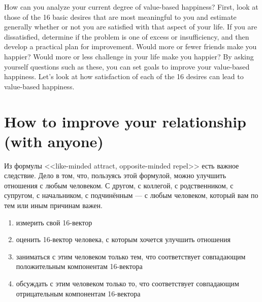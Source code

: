 \documentclass[11pt]{article}
\theoremstyle{remark}
\theoremstyle{definition}
\begin{document}

















How can you analyze your current degree of value-based happiness? First, look at those of the 16 basic desires that are most meaningful to you and estimate generally whether or not you are satisfied with that aspect of your life. If you are dissatisfied, determine if the problem is one of excess or insufficiency, and then develop a practical plan for improvement. Would more or fewer friends make you happier? Would more or less challenge in your life make you happier? By asking yourself questions such as these, you can set goals to improve your value-based happiness. Let’s look at how satisfaction of each of the 16 desires can lead to value-based happiness.



\section{How to improve your relationship (with anyone)}

Из формулы <<like-minded attract, opposite-minded repel>> есть важное следствие. Дело в том, что, пользуясь этой формулой, можно улучшить отношения с любым человеком. С другом, с коллегой, с родственником, с супругом, с начальником, с подчинённым --- с любым человеком, который вам по тем или иным причинам важен.



\begin{enumerate}
\item измерить свой 16-вектор
\item оценить 16-вектор человека, с которым хочется улучшить отношения
\item заниматься с этим человеком только тем, что соответствует совпадающим положительным компонентам 16-вектора
\item обсуждать с этим человеком только то, что соответствует совпадающим отрицательным компонентам 16-вектора

\end{enumerate}
\end{document}
